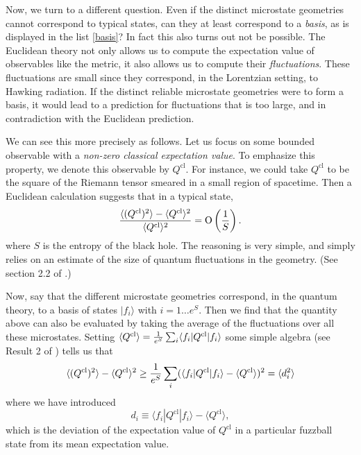 \documentclass[12pt]{article}
\def\qop{Q}
\def\Or[#1]{{\text{O}}\left({#1}\right)}
\newcommand{\be}{\begin{equation}}
\newcommand{\ee}{\end{equation}}
\begin{document}
Now, we turn to a different question. Even if the distinct microstate geometries cannot correspond to typical states, can they at least correspond to a {\em basis}, as is displayed in the list \eqref{basis}?  In fact this also turns out not be possible. The Euclidean theory not only allows us to compute the expectation value of observables like the metric, it also allows us to compute their {\em fluctuations}. These fluctuations are small since they correspond, in the Lorentzian setting, to Hawking radiation.  If the distinct reliable microstate geometries were to form a basis, it would lead to a prediction for fluctuations that is too large, and in contradiction with the Euclidean prediction.

We can see this more precisely as follows. Let us focus on some bounded observable with a {\em non-zero classical expectation value}. To emphasize this property, we denote this observable by $\qop^{\text{cl}}$. For instance, we could take $\qop^{\text{cl}}$ to be the square of the Riemann tensor smeared in a small region of spacetime.  Then a Euclidean calculation suggests that in a typical state, 
\be
{\langle (\qop^\text{cl})^2 \rangle - \langle \qop^{\text{cl}} \rangle^2 \over \langle \qop^{\text{cl}} \rangle^2} =\Or[{1 \over S}].
\ee
where $S$ is the entropy of the black hole. The reasoning is very simple, and simply relies on an estimate of the size of quantum fluctuations in the geometry. (See section 2.2 of \cite{Raju:2018xue}.)

Now, say that the different microstate geometries correspond, in the quantum theory, to a basis of states $|f_i \rangle$ with $i = 1 \ldots e^{S}$. Then we find that the quantity above can also be evaluated by taking the average of the fluctuations over all these microstates. Setting $\langle \qop^{\text{cl}} \rangle = {1 \over e^{S}} \sum_i \langle f_i | \qop^{\text{cl}} | f_i \rangle$ some simple algebra (see Result 2 of \cite{Raju:2018xue}) tells us that
\be
\langle (\qop^{\text{cl}})^2 \rangle - \langle \qop^{\text{cl}} \rangle^2  \geq {1 \over e^{S}} \sum_i (\langle f_i | \qop^{\text{cl}} | f_i \rangle - \langle \qop^{\text{cl}} \rangle)^2 = \langle d_i^2 \rangle
\ee
where we have introduced
\be
d_i \equiv \langle f_i | \qop^{\text{cl}} | f_i \rangle - \langle \qop^{\text{cl}}  \rangle,
\ee
which is the deviation of the expectation value of $\qop^{\text{cl}}$ in a particular fuzzball state from its mean expectation value. 
\end{document}
